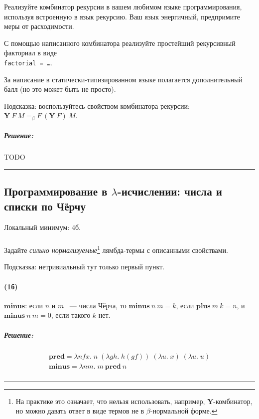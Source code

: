 \documentclass{article}
\newenvironment{proof}{\subparagraph{\hspace{-1em}Решение:\newline}}{\par\noindent\rule{\textwidth}{0.4pt}}
\newcommand{\comb}[1]{\mathbf{#1}}
\newcommand{\term}[1]{\mathbf{#1}}
\newcommand{\eqbeta}{=_\beta}
\begin{document}
    Реализуйте комбинатор рекурсии в вашем любимом языке программирования, используя встроенную в язык рекурсию.
    Ваш язык энергичный, предпримите меры от расходимости.

    С помощью написанного комбинатора реализуйте простейший рекурсивный факториал в виде \\ \texttt{factorial = \ldots}.

    За написание в статически-типизированном языке полагается дополнительный балл (но это может быть не просто).

    Подсказка: воспользуйтесь свойством комбинатора рекурсии: $\comb{Y}~F~M \eqbeta F~(\comb{Y}~F)~M$.

    \begin{proof}
        TODO %
    \end{proof}

    \subsection{Программирование в $\lambda$-исчислении: числа и списки по Чёрчу}

    Локальный минимум: 4б.

    \subsubsection{}

    Задайте \emph{сильно нормализуемые}\footnote{На практике это означает, что нельзя использовать, например, $\comb{Y}$-комбинатор, но можно давать ответ в виде термов не в $\beta$-нормальной форме.} лямбда-термы с описанными свойствами.

    Подсказка: нетривиальный тут только первый пункт.

    \paragraph{(1б)}

    $\term{minus}$: если $n$ и $m$ ~--- числа Чёрча, то $\term{minus}~n~m = k$,
    если $\term{plus}~m~k = n$, и $\term{minus}~n~m = 0$, если такого $k$
    нет.

    \begin{proof}
        \begin{gather*}
            \term{pred} = \lambda n f x.\; n\; (\lambda g h.\; h (g f))\; (\lambda u.\; x)\; (\lambda u.\; u)\\
            \term{minus} = \lambda n m.\; m~\term{pred}~n\\
        \end{gather*}
    \end{proof}
\end{document}
